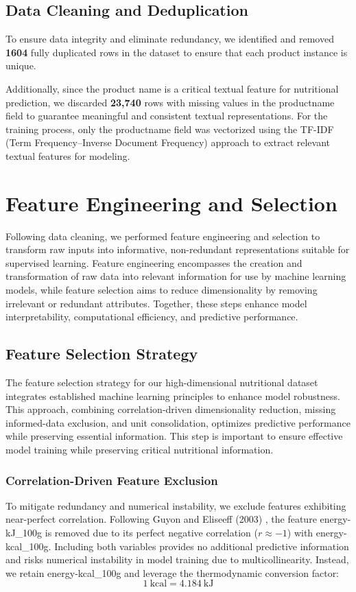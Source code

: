 \subsection{Data Cleaning and Deduplication}
To ensure data integrity and eliminate redundancy, we identified and removed \textbf{1604} fully duplicated rows in the dataset to ensure that each product instance is unique.
\par Additionally, since the product name is a critical textual feature for nutritional prediction, we discarded \textbf{23,740} rows with missing values in the product\textunderscore name field to guarantee meaningful and consistent textual representations. For the training process, only the product\textunderscore name field was vectorized using the TF-IDF (Term Frequency–Inverse Document Frequency) approach to extract relevant textual features for modeling.

\section{Feature Engineering and Selection}
Following data cleaning, we performed feature engineering and selection to transform raw inputs into informative, non-redundant representations suitable for supervised learning. 
Feature engineering encompasses the creation and transformation of raw data into relevant information for use by machine learning models\cite{ibm2025featureengineering}, while feature selection aims to reduce dimensionality by removing irrelevant or redundant attributes. 
Together, these steps enhance model interpretability, computational efficiency, and predictive performance.

\subsection{Feature Selection Strategy}
The feature selection strategy for our high-dimensional nutritional dataset integrates established machine learning principles to enhance model robustness. This approach, combining correlation-driven dimensionality reduction, missing  informed-data exclusion, and unit consolidation, optimizes predictive performance while preserving essential information. This step is important to ensure effective model training while preserving critical nutritional information.

\subsubsection{Correlation-Driven Feature Exclusion}
To mitigate redundancy and numerical instability, we exclude features exhibiting near-perfect correlation. Following Guyon and Eliseeff (2003) \cite{guyon2003}, the feature energy-kJ\_100g is removed due to its perfect negative correlation ($r \approx -1$) with energy-kcal\_100g. Including both variables provides no additional predictive information and risks numerical instability in model training due to multicollinearity. Instead, we retain energy-kcal\_100g and leverage the thermodynamic conversion factor:
$$1~\mathrm{kcal} = 4.184~\mathrm{kJ}$$

